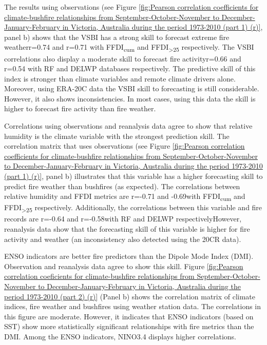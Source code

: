 The results using observations (see Figure \ref{fig:Pearson correlation coefficients for climate-bushfire relationships from September-October-November to December-January-February in Victoria, Australia during the period 1973-2010 (part 1) (r)},
panel b) shows that the VSBI has a strong skill to forecast extreme
fire weather\textemdash r=0.74 and r=0.71 with FFDI\textsubscript{cum}
and FFDI\textsubscript{>25} respectively\textemdash . The VSBI correlations
also display a moderate skill to forecast fire activity\textendash r=0.66
and r=0.54 with RF and DELWP databases respectively\textemdash . The
predictive skill of this index is stronger than climate variables
and remote climate drivers alone. Moreover, using ERA-20C data the
VSBI skill to forecasting is still considerable. However, it also
shows inconsistencies. In most cases, using this data the skill is
higher to forecast fire activity than fire weather.

Correlations using observations and reanalysis data agree to show
that relative humidity is the climate variable with the strongest
prediction skill. The correlation matrix that uses observations (see
Figure \ref{fig:Pearson correlation coefficients for climate-bushfire relationships from September-October-November to December-January-February in Victoria, Australia during the period 1973-2010 (part 1) (r)},
panel b) illustrates that this variable has a higher forecasting skill
to predict fire weather than bushfires (as expected). The correlations
between relative humidity and FFDI metrics are r=-0.71 and -0.69\textemdash with
FFDI\textsubscript{cum} and FFDI\textsubscript{>25} respectively\textemdash .
Additionally, the correlations between this variable and fire records
are r=-0.64 and r=-0.58\textemdash with RF and DELWP respectively\textemdash However,
reanalysis data show that the forecasting skill of this variable is
higher for fire activity and weather (an inconsistency also detected
using the 20CR data). 

ENSO indicators are better fire predictors than the Dipole Mode Index
(DMI). Observation and reanalysis data agree to show this skill. Figure
\ref{fig:Pearson correlation coeficients for climate-bushfire relationships from September-October-November to December-January-February in Victoria, Australia during the period 1973-2010 (part 2) (r)}
(Panel b) shows the correlation matrix of climate indices, fire weather
and bushfires using weather station data. The correlations in this
figure are moderate. However, it indicates that ENSO indicators (based
on SST) show more statistically significant relationships with fire
metrics than the DMI. Among the ENSO indicators, NINO3.4 displays
higher correlations.

